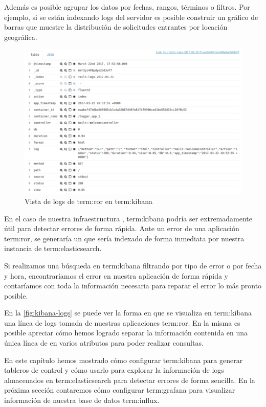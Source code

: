 Además es posible agrupar los datos por fechas, rangos, términos o filtros. Por
ejemplo, si se están indexando logs del servidor es posible construir un
gráfico de barras que muestre la distribución de solicitudes 
entrantes por locación geográfica.

\begin{figure}
  \includegraphics[width=\linewidth]{src/images/05-capitulo-5/kibana-logs.png}
  \caption{Vista de logs de \gls{term:ror} en \gls{term:kibana}}
  \label{fig:kibana-logs}
\end{figure}

En el caso de nuestra infraestructura , \gls{term:kibana} podría ser
extremadamente útil para detectar errores de forma rápida. Ante un error de una
aplicación \gls{term:ror}, se generaría un  que sería indexado de forma
inmediata por nuestra instancia de \gls{term:elasticsearch}.

Si realizamos una búsqueda en \gls{term:kibana} filtrando por tipo de error o
por fecha y hora, encontraríamos el error en nuestra aplicación de forma rápida
y contaríamos con toda la información necesaria para reparar el error lo más
pronto posible.

En la \autoref{fig:kibana-logs} se puede ver la forma en que se visualiza en
\gls{term:kibana} una línea de logs tomada de nuestras aplicaciones
\gls{term:ror}. En la misma es posible apreciar cómo hemos logrado separar la
información contenida en una única línea de  en varios atributos para
poder realizar consultas.

En este capítulo hemos mostrado cómo configurar \gls{term:kibana} para generar
tableros de control y cómo usarlo para explorar la información de logs
almacenados en \gls{term:elasticsearch} para detectar errores de forma sencilla.
En la próxima sección contaremos cómo configurar \gls{term:grafana} para
visualizar información de nuestra base de datos \gls{term:influx}.
